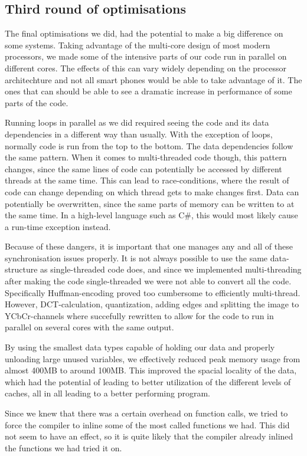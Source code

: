 \subsection{Third round of optimisations}
The final optimisations we did, had the potential to make a big difference on some systems.
Taking advantage of the multi-core design of most modern processors, we made some of the intensive parts of our code run in parallel on different cores.
The effects of this can vary widely depending on the processor architechture and not all smart phones would be able to take advantage of it.
The ones that can should be able to see a dramatic increase in performance of some parts of the code.

Running loops in parallel as we did required seeing the code and its data dependencies in a different way than usually.
With the exception of loops, normally code is run from the top to the bottom.
The data dependencies follow the same pattern.
When it comes to multi-threaded code though, this pattern changes, since the same lines of code can potentially be accessed by different threads at the same time.
This can lead to race-conditions, where the result of code can change depending on which thread gets to make changes first.
Data can potentially be overwritten, since the same parts of memory can be written to at the same time.
In a high-level language such as C\#, this would most likely cause a run-time exception instead.

Because of these dangers, it is important that one manages any and all of these synchronisation issues properly.
It is not always possible to use the same data-structure as single-threaded code does, and since we implemented multi-threading after making the code single-threaded we were not able to convert all the code.
Specifically Huffman-encoding proved too cumbersome to efficiently multi-thread.
However, DCT-calculation, quantization, adding edges and splitting the image to YCbCr-channels where succefully rewritten to allow for the code to run in parallel on several cores with the same output.

By using the smallest data types capable of holding our data and properly unloading large unused variables, we effectively reduced peak memory usage from almost 400MB to around 100MB.
This improved the spacial locality of the data, which had the potential of leading to better utilization of the different levels of caches, all in all leading to a better performing program.

Since we knew that there was a certain overhead on function calls, we tried to force the compiler to inline some of the most called functions we had. 
This did not seem to have an effect, so it is quite likely that the compiler already inlined the functions we had tried it on.

